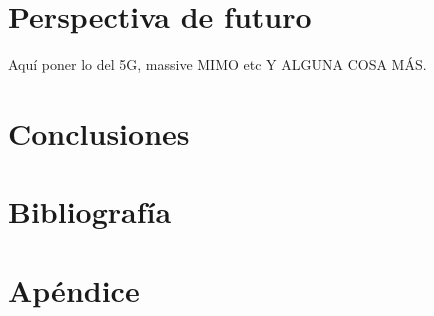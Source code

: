 \documentclass[a4paper,11pt]{book}
\begin{document}
\chapter{Perspectiva de futuro}
Aquí poner lo del 5G, massive MIMO etc Y ALGUNA COSA MÁS.
\chapter{Conclusiones}

\chapter{Bibliografía}



\chapter{Apéndice}





%
%
%
%
%
%
%
%
%
%
%
%
%
%
%
%
%
%
%
%
%
%
\chapter*{}
\thispagestyle{empty}
\end{document}

